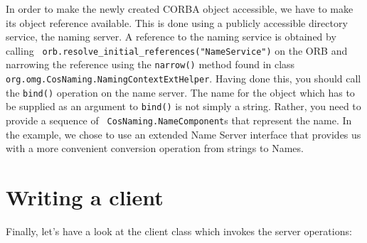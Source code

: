 In order to make the newly created CORBA object accessible, we have to
make its  object reference  available. This is  done using  a publicly
accessible directory  service, the naming  server. A reference  to the
naming      service     is      obtained      by     calling      {\tt
orb.resolve\_initial\_references("NameService")}   on   the  ORB   and
narrowing the reference using the {\tt narrow()} method found in class
{\tt org.omg.CosNaming.NamingContextExtHelper}.  Having done this, you
should call the  {\tt bind()} operation on the  name server.  The name
for the object which has to be supplied as an argument to {\tt bind()}
is not simply a string. Rather, you need to provide a sequence of {\tt
CosNaming.NameComponent}s that represent the  name. In the example, we
chose to use an extended Name Server interface that provides us with a
more convenient conversion operation from strings to Names.


\section{Writing a client}

Finally, let's have a look at the client class which invokes the
server operations:

